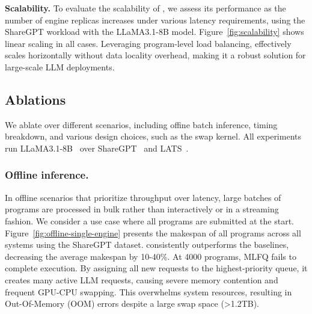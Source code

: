 \vspace{1mm}
\noindent \textbf{Scalability.} To evaluate the scalability of \text{\name}, we assess its performance as the number of engine replicas increases under various latency requirements, using the ShareGPT workload with the LLaMA3.1-8B model. Figure~\ref{fig:scalability} shows linear scaling in all cases. Leveraging program-level load balancing, \text{\name} effectively scales horizontally without data locality overhead, making it a robust solution for large-scale LLM deployments.



\subsection{Ablations}

We ablate \text{\name} over different scenarios, including offine batch inference, timing breakdown, and various design choices, such as the swap kernel. All experiments run LLaMA3.1-8B~\cite{llama3} over ShareGPT~\cite{sharegpt} and LATS~\cite{zhou2024languageagenttreesearch}.

\vspace{1mm}
\subsubsection{Offline inference.}

In offline scenarios that prioritize throughput over latency, large batches of programs are processed in bulk rather than interactively or in a streaming fashion. We consider a use case where all programs are submitted at the start. Figure~\ref{fig:offline-single-engine} presents the makespan of all programs across all systems using the ShareGPT dataset. \text{\name} consistently outperforms the baselines, decreasing the average makespan by 10-40\%. At 4000 programs, MLFQ fails to complete execution. By assigning all new requests to the highest-priority queue, it creates many active LLM requests, causing severe memory contention and frequent GPU-CPU swapping. This overwhelms system resources, resulting in Out-Of-Memory (OOM) errors despite a large swap space (>1.2TB).


